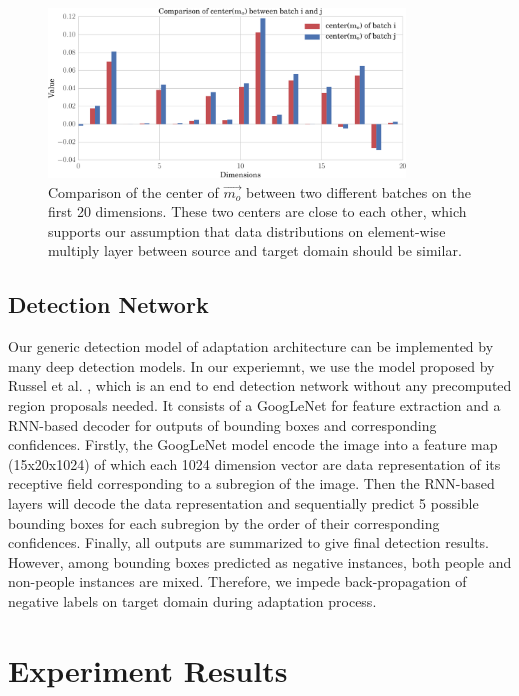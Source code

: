 \documentclass[runningheads]{llncs}
\begin{document}
\begin{figure}
\centering
\includegraphics[height=4.5cm]{images/mmd2.pdf}
\caption{Comparison of the center of $\vec{m_{o}}$ between two different batches on the first 20 dimensions. These two centers are close to each other, which supports our assumption that data distributions on element-wise multiply layer between source and target domain should be similar.  }
\label{fig:mmd2}
\end{figure}



\subsection{Detection Network}
\label{section:Detection Network}
Our generic detection model of adaptation architecture can be implemented by many deep detection models. In our experiemnt, we use the model proposed by Russel et al. \cite{stewart2015end}, which is an end to end detection network without any precomputed region proposals needed. It consists of a GoogLeNet \cite{szegedy2015going} for feature extraction and a RNN-based decoder for outputs of bounding boxes and corresponding confidences. Firstly, the GoogLeNet model encode the image into a feature map (15x20x1024) of which each 1024 dimension vector are data representation of its receptive field corresponding to a subregion of the image. Then the RNN-based layers will decode the data representation and sequentially predict 5 possible bounding boxes for each subregion by the order of their corresponding confidences. Finally, all outputs are summarized to give final detection results. However, among bounding boxes predicted as negative instances, both people and non-people instances are mixed. Therefore, we impede back-propagation of negative labels on target domain during adaptation process.



\section{Experiment Results}
\label{section:Experiment Results}
\end{document}
